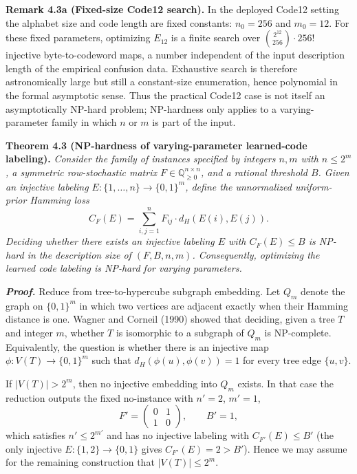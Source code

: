 \documentclass[
]{article}
\begin{document}
\textbf{Remark 4.3a (Fixed-size Code12 search).} In the deployed
Code12 setting the alphabet size and code length are fixed constants:
$n_0 = 256$ and $m_0 = 12$. For these fixed parameters, optimizing
$E_{12}$ is a finite search over $\binom{2^{12}}{256} \cdot 256!$
injective byte-to-codeword maps, a number independent of the input
description length of the empirical confusion data. Exhaustive search
is therefore astronomically large but still a constant-size
enumeration, hence polynomial in the formal asymptotic sense. Thus
the practical Code12 case is not itself an asymptotically NP-hard
problem; NP-hardness only applies to a varying-parameter family in
which $n$ or $m$ is part of the input.

\textbf{Theorem 4.3 (NP-hardness of varying-parameter learned-code
labeling).} \emph{Consider the family of instances specified by
integers $n, m$ with $n \leq 2^m$, a symmetric row-stochastic matrix
$F \in \mathbb{Q}_{\geq 0}^{n \times n}$, and a rational threshold
$B$. Given an injective labeling
$E : \{1, \ldots, n\} \to \{0, 1\}^m$, define the unnormalized
uniform-prior Hamming loss}
\[
C_F(E) = \sum_{i,j=1}^n F_{ij} \cdot d_H(E(i), E(j)).
\]
\emph{Deciding whether there exists an injective labeling $E$ with
$C_F(E) \leq B$ is NP-hard in the description size of $(F, B, n, m)$.
Consequently, optimizing the learned code labeling is NP-hard for
varying parameters.}

\emph{\textbf{Proof.}} Reduce from tree-to-hypercube subgraph
embedding. Let $Q_m$ denote the graph on $\{0,1\}^m$ in which two
vertices are adjacent exactly when their Hamming distance is one.
Wagner and Corneil (1990) showed that deciding, given a tree $T$ and
integer $m$, whether $T$ is isomorphic to a subgraph of $Q_m$ is
NP-complete. Equivalently, the question is whether there is an
injective map $\phi : V(T) \to \{0, 1\}^m$ such that
$d_H(\phi(u), \phi(v)) = 1$ for every tree edge $\{u, v\}$.

If $|V(T)| > 2^m$, then no injective embedding into $Q_m$ exists. In
that case the reduction outputs the fixed no-instance with $n' = 2$,
$m' = 1$,
\[
F' = \begin{pmatrix} 0 & 1 \\ 1 & 0 \end{pmatrix}, \qquad B' = 1,
\]
which satisfies $n' \leq 2^{m'}$ and has no injective labeling with
$C_{F'}(E) \leq B'$ (the only injective $E : \{1, 2\} \to \{0, 1\}$
gives $C_{F'}(E) = 2 > B'$). Hence we may assume for the remaining
construction that $|V(T)| \leq 2^m$.
\end{document}
